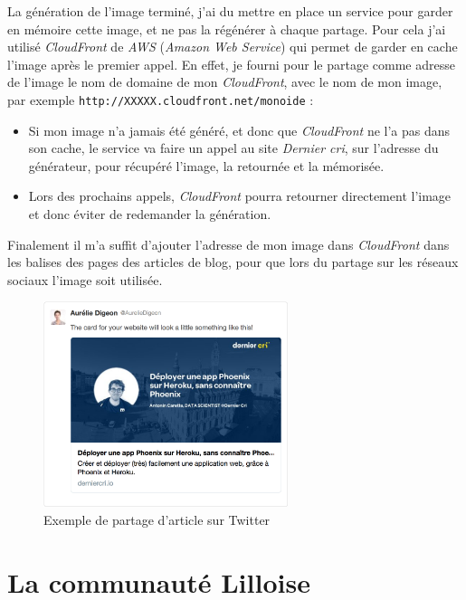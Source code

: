 \documentclass[12pt,a4paper]{article}
\begin{document}
  La génération de l'image terminé, j'ai du mettre en place un service
  pour garder en mémoire cette image, et ne pas la régénérer à chaque
  partage. Pour cela j'ai utilisé \emph{CloudFront} de \emph{AWS}
  (\emph{Amazon Web Service}) qui permet de garder en cache l'image après
  le premier appel. En effet, je fourni pour le partage comme adresse de
  l'image le nom de domaine de mon \emph{CloudFront}, avec le nom de mon
  image, par exemple \texttt{http://XXXXX.cloudfront.net/monoide} :

  \begin{itemize}
  \item
    Si mon image n'a jamais été généré, et donc que \emph{CloudFront} ne
    l'a pas dans son cache, le service va faire un appel au site
    \emph{Dernier cri}, sur l'adresse du générateur, pour récupéré
    l'image, la retournée et la mémorisée.
  \item
    Lors des prochains appels, \emph{CloudFront} pourra retourner
    directement l'image et donc éviter de redemander la génération.
  \end{itemize}

  \bigskip

  Finalement il m'a suffit d'ajouter l'adresse de mon image dans
  \emph{CloudFront} dans les balises des pages des articles de blog, pour
  que lors du partage sur les réseaux sociaux l'image soit utilisée.

  \begin{figure}[h]
    \centering
    \includegraphics[height=6cm]{figures/partage-blog.png}
    \caption{Exemple de partage d'article sur Twitter}
  \end{figure}

  \newpage

  \section{La communauté Lilloise}\label{la-communautuxe9-lilloise}
\end{document}
